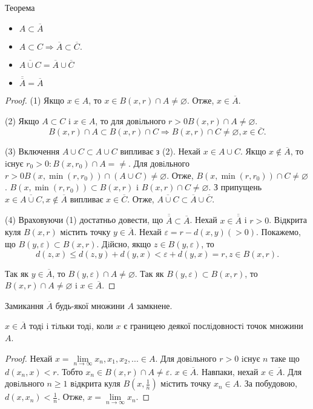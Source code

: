 Теорема
\begin{itemize}
    \item $A \subset \overline{A}$
    \item $A \subset C \Rightarrow \overline{A} \subset \overline{C}.$
    \item $\overline{A \cup C} = \overline{A} \cup \overline{C}$
    \item $\overline{\overline{A}} = \overline{A}$
\end{itemize}
\begin{proof}
    (1) Якщо $x \in A$, то $x \in B(x, r) \cap A \neq \varnothing$.
    Отже, $x \in \overline{A}$.
    
    (2) Якщо $A \subset C$ i $x \in A$, то для довiльного $r > 0 B(x, r) \cap A \neq \varnothing$.
    $$B(x, r) \cap A \subset B(x, r) \cap C \Rightarrow B(x, r) \cap C \neq \varnothing, x \in \overline{C}.$$
    
    (3) Включення $A \cup C \subset A \cup C$ випливає з (2).
    Нехай $x \in A \cup C$. Якщо $x \not\in \overline{A}$,
    то iснує $r_0 > 0: B(x, r_0) \cap A = \neq$.
    Для довiльного $r > 0 B(x, \min(r, r_0)) \cap (A \cup C) \neq \varnothing$.
    Отже, $B(x, \min(r, r_0)) \cap C \neq \varnothing$.
    $B(x, \min(r, r_0)) \subset B(x, r)$ i $B(x, r) \cap C \neq \varnothing$.
    З припущень $x \in \overline{A \cup C}, x \not\in \overline{A}$
    випливає $x \in \overline{C}$. Отже, $\overline{A \cup C} \subset \overline{A} \cup \overline{C}$.
    
    (4) Враховуючи (1) достатньо довести, що $\overline{\overline{A}} \subset \overline{A}$.
    Нехай $x \in \overline{\overline{A}}$ i $r > 0$.
    Вiдкрита куля $B(x, r)$ мiстить точку $y \in \overline{A}$. Нехай $\varepsilon = r - d(x, y)(> 0)$.
    Покажемо, що $B(y, \varepsilon) \subset B(x, r)$. Дiйсно, якщо $z \in B(y, \varepsilon)$, то
    $$d(z, x) \leqslant d(z, y) + d(y, x) < \varepsilon + d(y, x) = r, z \in B(x, r).$$

    Так як $y \in \overline{A}$, то $B(y, \varepsilon) \cap A \neq \varnothing$.
    Так як $B(y, \varepsilon) \subset B(x, r)$, то
    $B(x, r) \cap A \neq \varnothing$ i $x \in \overline{A}$.
\end{proof}

\begin{corollary}
    Замикання $\overline{A}$ будь-якої множини $A$ замкнене.
\end{corollary}

\begin{theorem}
    $x \in \overline{A}$ тодi i тiльки тодi, коли $x$ є границею деякої послiдовностi точок
    множини $A$.
\end{theorem}
\begin{proof}
    Нехай $x = \lim\limits_{n \rightarrow \infty} x_n, x_1, x_2, ... \in A$.
    Для довiльного $r > 0$ iснує $n$ таке що $d(x_n, x) < r$.
    Тобто $x_n \in B(x, r) \cap A \neq \varepsilon$. $x \in \overline{A}$.
    Навпаки, нехай $x \in \overline{A}$.
    Для довiльного $n \geqslant 1$ вiдкрита куля $B(x, \frac{1}{n})$ мiстить
    точку $x_n \in A$. За побудовою, $d(x, x_n) < \frac{1}{n}$.
    Отже, $x = \lim\limits_{n \rightarrow \infty} x_n$.
\end{proof}


